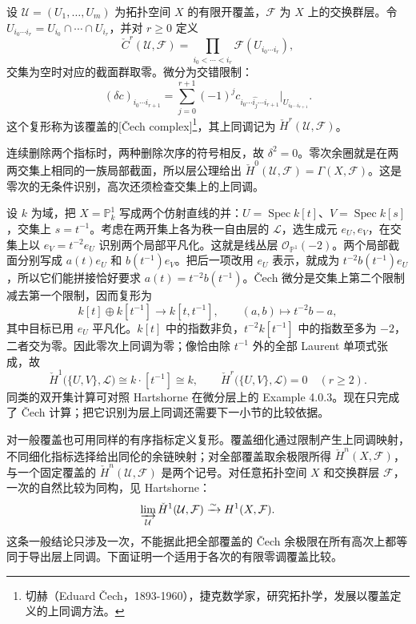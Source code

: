 \begin{definition}\label{b4:def:C-cech-complex}
	设 \(\mathcal U=(U_1,\ldots,U_m)\) 为拓扑空间 \(X\) 的有限开覆盖，\(\mathcal F\) 为 \(X\) 上的交换群层。令 \(U_{i_0\cdots i_r}=U_{i_0}\cap\cdots\cap U_{i_r}\)，并对 \(r\ge0\) 定义
	\[
		\check C^r(\mathcal U,\mathcal F) =\prod_{i_0<\cdots<i_r}\mathcal F(U_{i_0\cdots i_r}),
	\]
	交集为空时对应的截面群取零。微分为交错限制：
	\[
		(\delta c)_{i_0\cdots i_{r+1}} =\sum_{j=0}^{r+1}(-1)^j c_{i_0\cdots\widehat{i_j}\cdots i_{r+1}}|_{U_{i_0\cdots i_{r+1}}}.
	\]
	这个复形称为该覆盖的[Čech complex]\footnote{切赫（Eduard Čech，1893-1960），捷克数学家，研究拓扑学，发展以覆盖定义的上同调方法。}，其上同调记为 \(\check H^r(\mathcal U,\mathcal F)\)。
\end{definition}

连续删除两个指标时，两种删除次序的符号相反，故 \(\delta^2=0\)。零次余圈就是在两两交集上相同的一族局部截面，所以层公理给出 \(\check H^0(\mathcal U,\mathcal F)=\Gamma(X,\mathcal F)\)。这是零次的无条件识别，高次还须检查交集上的上同调。

\begin{example}\label{b4:exm:C-projective-line-cech}
	设 \(k\) 为域，把 \(X=\mathbb P^1_k\) 写成两个仿射直线的并：\(U=\operatorname{Spec}k[t]\)、\(V=\operatorname{Spec}k[s]\)，交集上 \(s=t^{-1}\)。考虑在两开集上各为秩一自由层的 \(\mathcal L\)，选生成元 \(e_U,e_V\)，在交集上以 \(e_V=t^{-2}e_U\) 识别两个局部平凡化。这就是线丛层 \(\mathcal O_{\mathbb P^1}(-2)\)。两个局部截面分别写成 \(a(t)e_U\) 和 \(b(t^{-1})e_V\)。把后一项改用 \(e_U\) 表示，就成为 \(t^{-2}b(t^{-1})e_U\)，所以它们能拼接恰好要求 \(a(t)=t^{-2}b(t^{-1})\)。Čech 微分是交集上第二个限制减去第一个限制，因而复形为
	\[
		k[t]\oplus k[t^{-1}]\longrightarrow k[t,t^{-1}], \qquad(a,b)\longmapsto t^{-2}b-a,
	\]
	其中目标已用 \(e_U\) 平凡化。\(k[t]\) 中的指数非负，\(t^{-2}k[t^{-1}]\) 中的指数至多为 \(-2\)，二者交为零。因此零次上同调为零；像恰由除 \(t^{-1}\) 外的全部 Laurent 单项式张成，故
	\[
		\check H^1\bigl(\{U,V\},\mathcal L\bigr)\cong k\cdot[t^{-1}]\cong k, \qquad \check H^r\bigl(\{U,V\},\mathcal L\bigr)=0\quad(r\ge2).
	\]
	同类的双开集计算可对照 Hartshorne 在微分层上的 Example 4.0.3\cite[Chapter III, Example 4.0.3, pp. 219--220]{Hartshorne1977}。现在只完成了 Čech 计算；把它识别为层上同调还需要下一小节的比较依据。
\end{example}

对一般覆盖也可用同样的有序指标定义复形。覆盖细化通过限制产生上同调映射，不同细化指标选择给出同伦的余链映射；对全部覆盖取余极限所得 \(\check H^n(X,\mathcal F)\)，与一个固定覆盖的 \(\check H^n(\mathcal U,\mathcal F)\) 是两个记号。对任意拓扑空间 \(X\) 和交换群层 \(\mathcal F\)，一次的自然比较为同构，见 Hartshorne\cite[Chapter III, Exercise 4.4, p. 223]{Hartshorne1977}：
\[
	\varinjlim_{\mathcal U}\check H^1(\mathcal U,\mathcal F) \xrightarrow{\sim}H^1(X,\mathcal F).
\]
这条一般结论只涉及一次，不能据此把全部覆盖的 Čech 余极限在所有高次上都等同于导出层上同调。下面证明一个适用于各次的有限零调覆盖比较。

